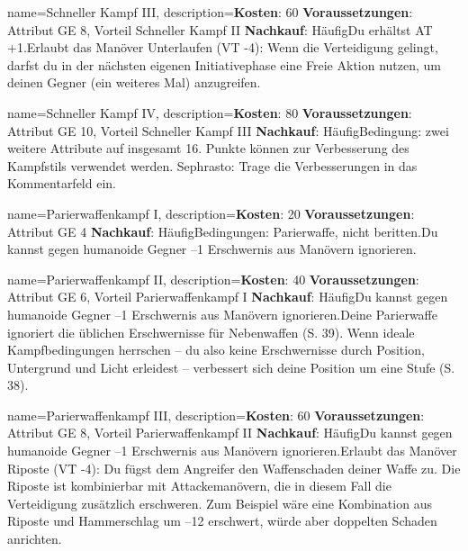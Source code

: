 {
    name={Schneller Kampf III},
    description={\textbf{Kosten}: 60 \textbf{Voraussetzungen}: Attribut GE 8, Vorteil Schneller Kampf II \textbf{Nachkauf}: Häufig\newline Du erhältst AT +1.\newline Erlaubt das Manöver Unterlaufen (VT -4): Wenn die Verteidigung gelingt, darfst du in der nächsten eigenen Initiativephase eine Freie Aktion nutzen, um deinen Gegner (ein weiteres Mal) anzugreifen.}
}


{
    name={Schneller Kampf IV},
    description={\textbf{Kosten}: 80 \textbf{Voraussetzungen}: Attribut GE 10, Vorteil Schneller Kampf III \textbf{Nachkauf}: Häufig\newline Bedingung: zwei weitere Attribute auf insgesamt 16. Punkte können zur Verbesserung des Kampfstils verwendet werden. Sephrasto: Trage die Verbesserungen in das Kommentarfeld ein.}
}


{
    name={Parierwaffenkampf I},
    description={\textbf{Kosten}: 20 \textbf{Voraussetzungen}: Attribut GE 4 \textbf{Nachkauf}: Häufig\newline Bedingungen: Parierwaffe, nicht beritten.\newline Du kannst gegen humanoide Gegner –1 Erschwernis aus Manövern ignorieren.}
}


{
    name={Parierwaffenkampf II},
    description={\textbf{Kosten}: 40 \textbf{Voraussetzungen}: Attribut GE 6, Vorteil Parierwaffenkampf I \textbf{Nachkauf}: Häufig\newline Du kannst gegen humanoide Gegner –1 Erschwernis aus Manövern ignorieren.\newline Deine Parierwaffe ignoriert die üblichen Erschwernisse für Nebenwaffen (S. 39). Wenn ideale Kampfbedingungen herrschen – du also keine Erschwernisse durch Position, Untergrund und Licht erleidest – verbessert sich deine Position um eine Stufe (S. 38).}
}


{
    name={Parierwaffenkampf III},
    description={\textbf{Kosten}: 60 \textbf{Voraussetzungen}: Attribut GE 8, Vorteil Parierwaffenkampf II \textbf{Nachkauf}: Häufig\newline Du kannst gegen humanoide Gegner –1 Erschwernis aus Manövern ignorieren.\newline Erlaubt das Manöver Riposte (VT -4): Du fügst dem Angreifer den Waffenschaden deiner Waffe zu. Die Riposte ist kombinierbar mit Attackemanövern, die in diesem Fall die Verteidigung zusätzlich erschweren. Zum Beispiel wäre eine Kombination aus Riposte und Hammerschlag um –12 erschwert, würde aber doppelten Schaden anrichten.}
}


